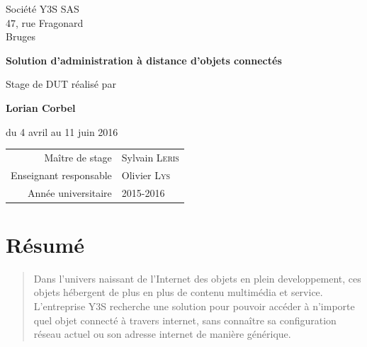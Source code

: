 \documentclass[a4paper,12pt]{book}
\theoremstyle{break}
\begin{document}
\begin{titlepage}
\begin{minipage}[b]{0.25\linewidth}
  \small
  Société Y3S SAS\\
  47, rue Fragonard\\
  Bruges
\end{minipage}

{%
  \bfseries\LARGE
  Solution d'administration à distance d'objets connectés
}

Stage de DUT réalisé par\par\medskip
{\Large \bfseries Lorian Corbel}\par\medskip
du 4 avril au 11 juin 2016

\renewcommand{\arraystretch}{1.5}
\begin{tabular}{r@{\quad}l}
  Maître de stage & Sylvain \textsc{Leris} \\
  Enseignant responsable & Olivier \textsc{Lys} \\
  Année universitaire & 2015-2016
\end{tabular}
\end{titlepage}


\frontmatter





\chapter{Résumé}
\begin{quotation}
	Dans l'univers naissant de l'Internet des objets en plein developpement, ces objets hébergent de plus en plus de contenu multimédia et service. L'entreprise Y3S recherche une solution pour pouvoir accéder à n'importe quel objet connecté à travers internet, sans connaître sa configuration réseau actuel ou son adresse internet de manière générique.
\end{quotation}
\end{document}

